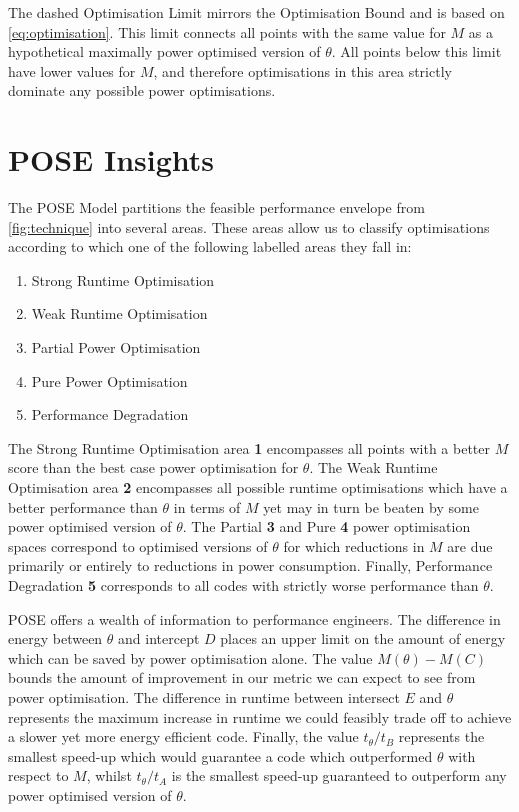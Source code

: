 The dashed Optimisation Limit  mirrors the Optimisation Bound and is based on \autoref{eq:optimisation}. This limit connects all points with the same value for $M$ as a hypothetical maximally power optimised version of $\theta$. 
All points below this limit have lower values for $M$, and therefore optimisations in this area strictly dominate any possible power optimisations. 

\section{POSE Insights}
\label{sec:insights}
The POSE Model partitions the feasible performance envelope from \autoref{fig:technique} into several areas.
These areas allow us to classify optimisations according to which one of the following labelled areas they fall in:

\begin{multicols}{2}
\begin{enumerate}
\item Strong Runtime Optimisation
\item Weak Runtime Optimisation
\item Partial Power Optimisation
\item Pure Power Optimisation
\item Performance Degradation \columnbreak
\end{enumerate}
\end{multicols}

The Strong Runtime Optimisation area \textbf{1} encompasses all points with a better $M$ score than the best case power optimisation for $\theta$. The Weak Runtime Optimisation area \textbf{2} encompasses all possible runtime optimisations which have a better performance than $\theta$ in terms of $M$ yet may in turn be beaten by some power optimised version of $\theta$. The Partial \textbf{3} and Pure \textbf{4} power optimisation spaces correspond to optimised versions of $\theta$ for which reductions in $M$ are due primarily or entirely to reductions in power consumption.
Finally, Performance Degradation \textbf{5} corresponds to all codes with strictly worse performance than $\theta$.

POSE offers a wealth of information to performance engineers.
The difference in energy between $\theta$ and intercept $D$ places an upper limit on the amount of energy which can be saved by power optimisation alone.
The value $M(\theta) - M(C)$ bounds the amount of improvement in our metric we can expect to see from power optimisation.
The difference in runtime between intersect $E$ and $\theta$ represents the maximum increase in runtime we could feasibly trade off to achieve a slower yet more energy efficient code.
Finally, the value $t_\theta / t_B$ represents the smallest speed-up which would guarantee a code which outperformed $\theta$ with respect to $M$, whilst $t_\theta / t_A$ is the smallest speed-up guaranteed to outperform any power optimised version of $\theta$.

